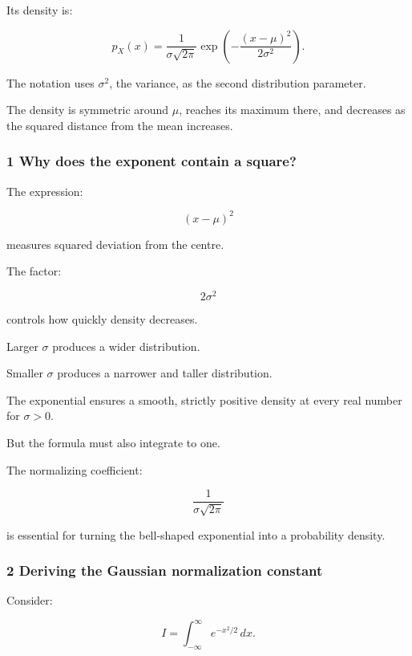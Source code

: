 Its density is:

\[
 \boxed{ p_X(x)= \frac1{\sigma\sqrt{2\pi}} \exp\left( -\frac{(x-\mu)^2}{2\sigma^2} \right) }.
\]

The notation uses \(\sigma^2\), the variance, as the second distribution parameter.

The density is symmetric around \(\mu\), reaches its maximum there, and decreases as the squared distance from the mean increases.

\subsubsection{1 Why does the exponent contain a square?}\label{02-foundations-ii-ch023-why-does-the-exponent-contain-a-square}

\hypertarget{02-foundations-ii-ch023-why-does-the-exponent-contain-a-square}{}

The expression:

\[
 (x-\mu)^2
\]

measures squared deviation from the centre.

The factor:

\[
 2\sigma^2
\]

controls how quickly density decreases.

Larger \(\sigma\) produces a wider distribution.

Smaller \(\sigma\) produces a narrower and taller distribution.

The exponential ensures a smooth, strictly positive density at every real number for \(\sigma>0\).

But the formula must also integrate to one.

The normalizing coefficient:

\[
 \frac1{\sigma\sqrt{2\pi}}
\]

is essential for turning the bell-shaped exponential into a probability density.

\subsubsection{2 Deriving the Gaussian normalization constant}\label{02-foundations-ii-ch023-deriving-the-gaussian-normalization-constant}

\hypertarget{02-foundations-ii-ch023-deriving-the-gaussian-normalization-constant}{}

Consider:

\[
 I=\int_{-\infty}^{\infty}e^{-x^2/2}\,dx.
\]

